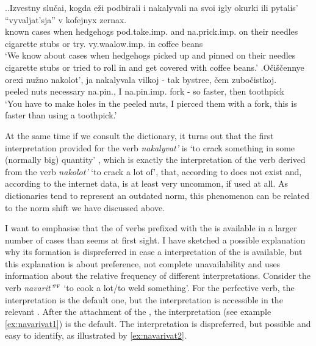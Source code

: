 \ex.\label{ex:nakalyvat}\ag.Izvestny slu\v{c}ai, kogda e\v{z}i podbirali i nakalyvali na svoi igly okurki ili pytalis' ``vyvaljat'sja'' v kofejnyx zernax.\\
known cases when hedgehogs pod.take.imp. and na.prick.imp. on their needles {cigarette stubs} or try. vy.waalow.imp. in coffee beans\\
\trans `We know about cases when hedgehogs picked up and pinned on their needles cigarette stubs or tried to roll in and get covered with coffee beans.'
\bg.O\v{c}i\v{s}\v{c}ennye orexi nu\v{z}no nakolot', ja nakalyvala vilkoj - tak bystree, \v{c}em zubo\v{c}istkoj.\\
peeled nuts necessary na.pin., I na.pin.imp. fork - so faster, then toothpick\\
\trans `You have to make holes in the peeled nuts, I pierced them with a fork, this is faster than using a toothpick.'\\

At the same time if we consult the dictionary, it turns out that the first interpretation provided for the verb \textit{nakalyvat'} is `to crack something in some (normally big) quantity' \citep{Efremova:00}, which is exactly the interpretation of the  verb derived from the verb \textit{nakolot'} `to crack a lot of', that, according to \citet{Svenonius:04b} does not exist and, according to the internet data, is at least very uncommon, if used at all. As dictionaries tend to represent an outdated norm, this phenomenon can be related to the norm shift we have discussed above.

I want to emphasise that the  of verbs prefixed with the   is available in a larger number of cases than seems at first sight. I have sketched a possible explanation why its formation is dispreferred in case a  interpretation of the  is available, but this explanation is about preference, not complete unavailability and uses information about the relative frequency of different interpretations. Consider the verb \textit{navarit'}$^{\textsc{pf}}$ `to cook a lot/to weld something'. For the perfective verb, the  interpretation is the default one, but the  interpretation is accessible in the relevant . After the attachment of the , the  interpretation (see example \ref{ex:navarivat1}) is the default. The  interpretation is dispreferred, but possible and easy to identify, as illustrated by \ref{ex:navarivat2}.

